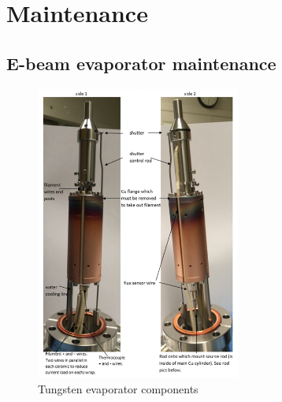 \chapter{Maintenance}
\section{E-beam evaporator maintenance}
\begin{figure}[H]
	\centering
	\includegraphics[width=0.6\textwidth]{W-evaporator.png}  %
	\caption{Tungsten evaporator components}
	\label{fig:W-evaporator}
\end{figure}
